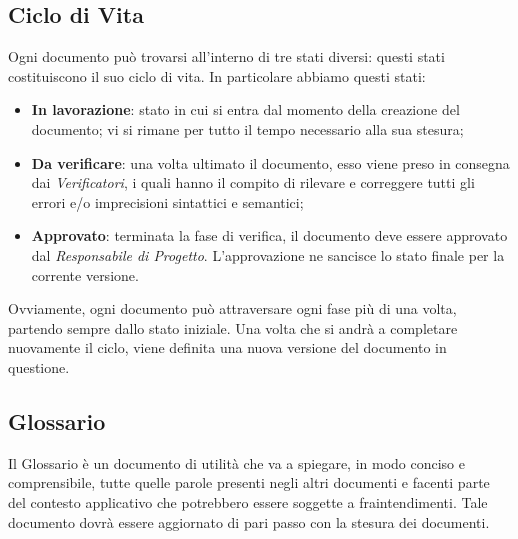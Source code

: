 \subsection{Ciclo di Vita}
Ogni documento può trovarsi all'interno di tre stati diversi: questi stati costituiscono il suo ciclo di vita. In particolare abbiamo questi stati:
\begin{itemize}
\item \textbf{In lavorazione}: stato in cui si entra dal momento della creazione del documento; vi si rimane per tutto il tempo necessario alla sua stesura;
\item \textbf{Da verificare}: una volta ultimato il documento, esso viene preso in consegna dai \textit{Verificatori}, i quali hanno il compito di rilevare e correggere tutti gli errori e/o imprecisioni sintattici e semantici;
\item \textbf{Approvato}: terminata la fase di verifica, il documento deve essere approvato dal \textit{Responsabile di Progetto}. L'approvazione ne sancisce lo stato finale per la corrente versione.
\end{itemize}
Ovviamente, ogni documento può attraversare ogni fase più di una volta, partendo sempre dallo stato iniziale. Una volta che si andrà a completare nuovamente il ciclo, viene definita una nuova versione del documento in questione.

\subsection{Glossario}
Il Glossario è un documento di utilità che va a spiegare, in modo conciso e comprensibile, tutte quelle parole presenti negli altri documenti e facenti parte del contesto applicativo che potrebbero essere soggette a fraintendimenti. Tale documento dovrà essere aggiornato di pari passo con la stesura dei documenti.